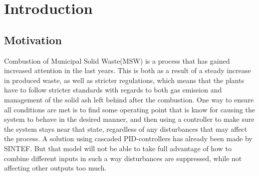 \chapter{Introduction}\label{cha:introduction}
%





\section{Motivation}\label{sec:motivation}

Combustion of Municipal Solid Waste(MSW) is a process that has gained increased attention in the last years. This is both as a result of a steady increase in produced waste, as well as stricter regulations, which means that the plants have to follow stricter standards with regards to both gas emission and management of the solid ash left behind after the combustion. One way to ensure all conditions are met is to find some operating point that is know for causing the system to behave in the desired manner, and then using a controller to make sure the system stays near that state, regardless of any disturbances that may affect the process. A solution using cascaded PID-controllers has already been made by SINTEF. But that model will not be able to take full advantage of how to combine different inputs in such a way disturbances are suppressed, while not affecting other outputs too much. 

